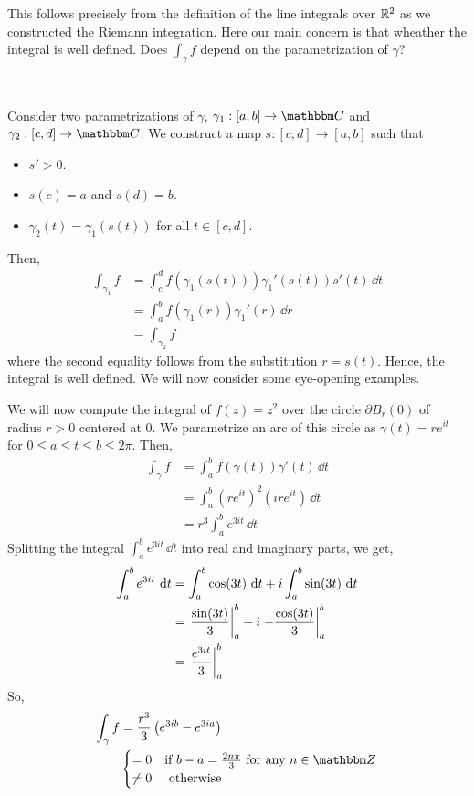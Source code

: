 \documentclass[../ComplexAnalysis_Notes.tex]{subfiles}
\begin{document}
This follows precisely from the definition of the line integrals over \(\mathbb{R}^2\) as we constructed the Riemann integration. Here our main concern is that wheather the integral is well defined. Does \(\int_\gamma f\) depend on the parametrization of \(\gamma\)?

\

Consider two parametrizations of \(\gamma\), \(\gamma_1 : [a, b] \to \C\) and \(\gamma_2 : [c, d] \to \C\). We construct a map \(s : [c, d] \to [a, b]\) such that
\begin{itemize}
  \item \(s' > 0\).
  \item \(s(c) = a\) and \(s(d) = b\).
  \item \(\gamma_2(t) = \gamma_1(s(t))\) for all \(t \in [c, d]\).
\end{itemize}
Then,
\begin{align*}
  \int_{\gamma_1} f
   & = \int_c^d f(\gamma_1(s(t))) \gamma_1'(s(t)) s'(t) \, \dd{t} \\
   & = \int_a^b f(\gamma_1(r)) \gamma_1'(r) \, \dd{r}             \\
   & = \int_{\gamma_2} f
\end{align*}
where the second equality follows from the substitution \(r = s(t)\). Hence, the integral is well defined. We will now consider some eye-opening examples.

\begin{Eg}{}{}
  We will now compute the integral of \(f(z) = z^2\) over the circle \(\partial B_r(0)\) of radius \(r > 0 \) centered at \(0\). We parametrize an arc of this circle as \(\gamma(t) = re^{it}\) for \(0 \leq a \leq t \leq b \leq 2\pi\). Then,
  \begin{align*}
    \int_\gamma f
     & = \int_a^b f(\gamma(t)) \gamma'(t) \, \dd{t} \\
     & = \int_a^b (re^{it})^2 (ire^{it}) \, \dd{t}  \\
     & = r^3 \int_a^b e^{3it} \, \dd{t}
  \end{align*}
  Splitting the integral \(\int_a^b e^{3it} \, \dd{t}\) into real and imaginary parts, we get,
  \begin{align*}
    \int_a^b e^{3it} \, \dd{t}
     & = \int_a^b \cos(3t) \, \dd{t} + i \int_a^b \sin(3t) \, \dd{t}      \\
     & = \eval{\frac{\sin(3t)}{3}}_a^b + i \eval{-\frac{\cos(3t)}{3}}_a^b \\
     & = \eval{\frac{e^{3it}}{3}}_a^b
  \end{align*}
  So, \begin{align*}
    \int_\gamma f
     & = \frac{r^3}{3} \left( e^{3ib} - e^{3ia} \right)                      \\
     & \begin{cases}
         = 0    & \text{if } b - a = \frac{2n\pi}{3} \text{ for any } n \in \Z \\
         \neq 0 & \text{ otherwise }
       \end{cases}
  \end{align*}
\end{Eg}
\end{document}
